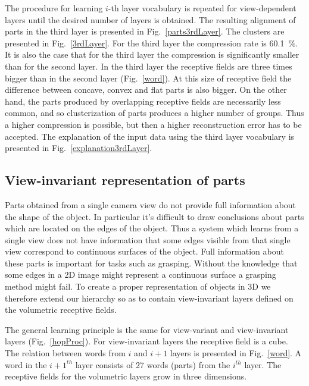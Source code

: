 \documentclass[letterpaper,10pt,conference]{ieeeconf}  %
\begin{document}
The procedure for learning $i$-th layer vocabulary is repeated for view-dependent layers until the desired number of layers is obtained. The resulting alignment of parts in the third layer is presented in Fig.~\ref{parts3rdLayer}. The clusters are presented in Fig.~\ref{3rdLayer}. For the third layer the compression rate is 60.1~\%. It is also the case that for the third layer the compression is significantly smaller than for the second layer. In the third layer the receptive fields are three times bigger than in the second layer (Fig.~\ref{word}). At this size of receptive field the difference between concave, convex and flat parts is also bigger. On the other hand, the parts produced by overlapping receptive fields are necessarily less common, and so clusterization of parts produces a higher number of groups. Thus a higher compression is possible, but then a higher reconstruction error has to be accepted. The explanation of the input data using the third layer vocabulary is presented in Fig.~\ref{explanation3rdLayer}.

\subsection{View-invariant representation of parts}

Parts obtained from a single camera view do not provide full information about the shape of the object. In particular it's difficult to draw conclusions about parts which are located on the edges of the object. Thus a system which learns from a single view does not have information that some edges visible from that single view correspond to continuous surfaces of the object. Full information about these parts is important for tasks such as grasping. Without the knowledge that some edges in a 2D image might represent a continuous surface a grasping method might fail. To create a proper representation of objects in 3D we therefore extend our hierarchy so as to contain view-invariant layers defined on the volumetric receptive fields.


The general learning principle is the same for view-variant and view-invariant layers (Fig.~\ref{hopProc}). For view-invariant layers the receptive field is a cube. The relation between words from $i$ and $i+1$ layers is presented in Fig.~\ref{word}. A word in the $i+1^{th}$ layer consists of 27 words (parts) from the $i^{th}$ layer. The receptive fields for the volumetric layers grow in three dimensions.
\end{document}
